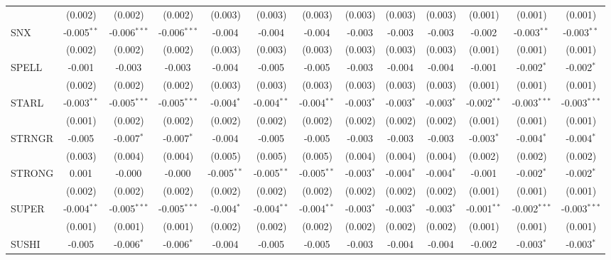 \begin{table}[!htbp]
\begin{tabular}{@{\extracolsep{5pt}}lcccccccccccc}
  & (0.002) & (0.002) & (0.002) & (0.003) & (0.003) & (0.003) & (0.003) & (0.003) & (0.003) & (0.001) & (0.001) & (0.001) \\
 SNX & -0.005$^{**}$ & -0.006$^{***}$ & -0.006$^{***}$ & -0.004$^{}$ & -0.004$^{}$ & -0.004$^{}$ & -0.003$^{}$ & -0.003$^{}$ & -0.003$^{}$ & -0.002$^{}$ & -0.003$^{**}$ & -0.003$^{**}$ \\
  & (0.002) & (0.002) & (0.002) & (0.003) & (0.003) & (0.003) & (0.003) & (0.003) & (0.003) & (0.001) & (0.001) & (0.001) \\
 SPELL & -0.001$^{}$ & -0.003$^{}$ & -0.003$^{}$ & -0.004$^{}$ & -0.005$^{}$ & -0.005$^{}$ & -0.003$^{}$ & -0.004$^{}$ & -0.004$^{}$ & -0.001$^{}$ & -0.002$^{*}$ & -0.002$^{*}$ \\
  & (0.002) & (0.002) & (0.002) & (0.003) & (0.003) & (0.003) & (0.003) & (0.003) & (0.003) & (0.001) & (0.001) & (0.001) \\
 STARL & -0.003$^{**}$ & -0.005$^{***}$ & -0.005$^{***}$ & -0.004$^{*}$ & -0.004$^{**}$ & -0.004$^{**}$ & -0.003$^{*}$ & -0.003$^{*}$ & -0.003$^{*}$ & -0.002$^{**}$ & -0.003$^{***}$ & -0.003$^{***}$ \\
  & (0.001) & (0.002) & (0.002) & (0.002) & (0.002) & (0.002) & (0.002) & (0.002) & (0.002) & (0.001) & (0.001) & (0.001) \\
 STRNGR & -0.005$^{}$ & -0.007$^{*}$ & -0.007$^{*}$ & -0.004$^{}$ & -0.005$^{}$ & -0.005$^{}$ & -0.003$^{}$ & -0.003$^{}$ & -0.003$^{}$ & -0.003$^{*}$ & -0.004$^{*}$ & -0.004$^{*}$ \\
  & (0.003) & (0.004) & (0.004) & (0.005) & (0.005) & (0.005) & (0.004) & (0.004) & (0.004) & (0.002) & (0.002) & (0.002) \\
 STRONG & 0.001$^{}$ & -0.000$^{}$ & -0.000$^{}$ & -0.005$^{**}$ & -0.005$^{**}$ & -0.005$^{**}$ & -0.003$^{*}$ & -0.004$^{*}$ & -0.004$^{*}$ & -0.001$^{}$ & -0.002$^{*}$ & -0.002$^{*}$ \\
  & (0.002) & (0.002) & (0.002) & (0.002) & (0.002) & (0.002) & (0.002) & (0.002) & (0.002) & (0.001) & (0.001) & (0.001) \\
 SUPER & -0.004$^{**}$ & -0.005$^{***}$ & -0.005$^{***}$ & -0.004$^{*}$ & -0.004$^{**}$ & -0.004$^{**}$ & -0.003$^{*}$ & -0.003$^{*}$ & -0.003$^{*}$ & -0.001$^{**}$ & -0.002$^{***}$ & -0.003$^{***}$ \\
  & (0.001) & (0.001) & (0.001) & (0.002) & (0.002) & (0.002) & (0.002) & (0.002) & (0.002) & (0.001) & (0.001) & (0.001) \\
 SUSHI & -0.005$^{}$ & -0.006$^{*}$ & -0.006$^{*}$ & -0.004$^{}$ & -0.005$^{}$ & -0.005$^{}$ & -0.003$^{}$ & -0.004$^{}$ & -0.004$^{}$ & -0.002$^{}$ & -0.003$^{*}$ & -0.003$^{*}$ \\

\end{tabular}
\end{table}
